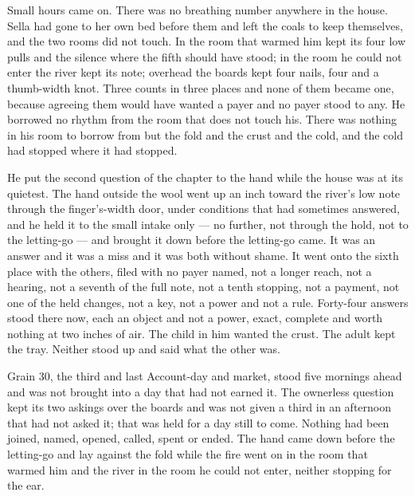 Small hours came on. There was no breathing number anywhere in the house. Sella had gone to her own bed before them and left the coals to keep themselves, and the two rooms did not touch. In the room that warmed him  kept its four low pulls and the silence where the fifth should have stood; in the room he could not enter the river kept its note; overhead the boards kept four nails, four and a thumb-width knot. Three counts in three places and none of them became one, because agreeing them would have wanted a payer and no payer stood to any. He borrowed no rhythm from the room that does not touch his. There was nothing in his room to borrow from but the fold and the crust and the cold, and the cold had stopped where it had stopped.

He put the second question of the chapter to the hand while the house was at its quietest. The hand outside the wool went up an inch toward the river's low note through the finger's-width door, under conditions that had sometimes answered, and he held it to the small intake only --- no further, not through the hold, not to the letting-go --- and brought it down before the letting-go came. It was an answer and it was a miss and it was both without shame. It went onto the sixth place with the others, filed with no payer named, not a longer reach, not a hearing, not a seventh of the full note, not a tenth stopping, not a payment, not one of the held changes, not a key, not a power and not a rule. Forty-four answers stood there now, each an object and not a power, exact, complete and worth nothing at two inches of air. The child in him wanted the crust. The adult kept the tray. Neither stood up and said what the other was.

Grain 30, the third and last Account-day and market, stood five mornings ahead and was not brought into a day that had not earned it. The ownerless question kept its two askings over the boards and was not given a third in an afternoon that had not asked it; that was held for a day still to come. Nothing had been joined, named, opened, called, spent or ended. The hand came down before the letting-go and lay against the fold while the fire went on in the room that warmed him and the river in the room he could not enter, neither stopping for the ear.
